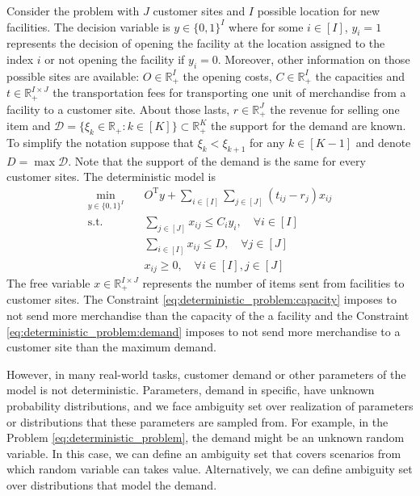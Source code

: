 \documentclass[12pt, letterpaper]{article}
\newcommand{\R}{\mathbb{R}}
\newcommand{\T}{\mathrm{T}}
\newcommand{\Dcal}{\mathcal{D}}
\begin{document}
	Consider the problem with $J$ customer sites and $I$ possible location for new facilities. The decision variable is $y \in \{0, 1\}^I$ where for some $i \in [I]$, $y_i = 1$ represents the decision of opening the facility at the location assigned to the index $i$ or not opening the facility if $y_i = 0$. Moreover, other information on those possible sites are available: $O \in \R_+^I$ the opening costs, $C \in \R_+^I$ the capacities and $t \in \R_+^{I \times J}$ the transportation fees for transporting one unit of merchandise from a facility to a customer site. About those lasts, $r \in \R_+^J$ the revenue for selling one item and $\Dcal = \{\xi_k \in \R_+: k \in [K]\} \subset \R_+^K$ the support for the demand are known. To simplify the notation suppose that $\xi_k < \xi_{k+1}$ for any $k \in [K-1]$ and denote $D = \max \Dcal$. Note that the support of the demand is the same for every customer sites. The deterministic model is
	\begin{subequations} \label{eq:deterministic_problem}
		\begin{align}
			\min_{y \in \{0, 1\}^I} &\quad O^\T y + \sum_{i \in [I]} \sum_{j \in [J]} (t_{ij} - r_j) x_{ij} \\
			\text{s.t.} &\quad \sum_{j \in [J]} x_{ij} \le C_i y_i, \quad \forall i \in [I] \\ \label{eq:deterministic_problem:capacity}
			&\quad \sum_{i \in [I]} x_{ij} \le D, \quad \forall j \in [J] \\ \label{eq:deterministic_problem:demand}
			&\quad x_{ij} \ge 0, \quad \forall i \in [I], j \in [J]
		\end{align}
	\end{subequations}
	The free variable $x \in \R_+^{I \times J}$ represents the number of items sent from facilities to customer sites. The Constraint \eqref{eq:deterministic_problem:capacity} imposes to not send more merchandise than the capacity of the a facility and the Constraint \eqref{eq:deterministic_problem:demand} imposes to not send more merchandise to a customer site than the maximum demand.
	
	However, in many real-world tasks, customer demand or other parameters of the model is not deterministic. Parameters, demand in specific, have unknown probability distributions, and we face ambiguity set over realization of parameters or distributions that these parameters are sampled from. For example, in the Problem \eqref{eq:deterministic_problem}, the demand might be an unknown random variable. In this case, we can define an ambiguity set that covers scenarios from which random variable can takes value. Alternatively, we can define ambiguity set over distributions that model the demand.
	
\end{document}
